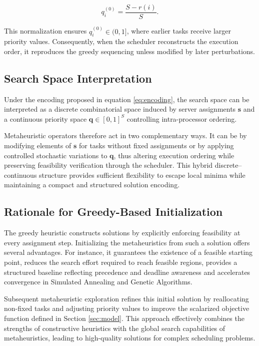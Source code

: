 \documentclass[11pt,a4paper]{article}
\begin{document}
\[
q_i^{(0)} = \frac{S - r(i)}{S}.
\]

This normalization ensures $q_i^{(0)} \in (0,1]$, where earlier tasks receive larger priority values. Consequently, when the scheduler reconstructs the execution order, it reproduces the greedy sequencing unless modified by later perturbations.

\subsection{Search Space Interpretation}

Under the encoding proposed in equation \ref{eq:encoding}, the search space can be interpreted as a discrete combinatorial space induced by server assignments $\mathbf{s}$ and a continuous priority space $\mathbf{q} \in [0,1]^{S}$ controlling intra-processor ordering.

Metaheuristic operators therefore act in two complementary ways. It can be by modifying elements of $\mathbf{s}$ for tasks without fixed assignments or by applying controlled stochastic variations to $\mathbf{q}$, thus altering execution ordering while preserving feasibility verification through the scheduler. This hybrid discrete–continuous structure provides sufficient flexibility to escape local minima while maintaining a compact and structured solution encoding.

\subsection{Rationale for Greedy-Based Initialization}

The greedy heuristic constructs solutions by explicitly enforcing feasibility at every assignment step. Initializing the metaheuristics from such a solution offers several advantages. For instance, it guarantees the existence of a feasible starting point, reduces the search effort required to reach feasible regions, provides a structured baseline reflecting precedence and deadline awareness and accelerates convergence in Simulated Annealing and Genetic Algorithms.

Subsequent metaheuristic exploration refines this initial solution by reallocating non-fixed tasks and adjusting priority values to improve the scalarized objective function defined in Section \ref{sec:model}. This approach effectively combines the strengths of constructive heuristics with the global search capabilities of metaheuristics, leading to high-quality solutions for complex scheduling problems.
\end{document}
